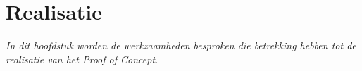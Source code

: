 \section{Realisatie}

\textit{In dit hoofdstuk worden de werkzaamheden besproken die betrekking hebben tot de realisatie van het Proof of Concept.}


